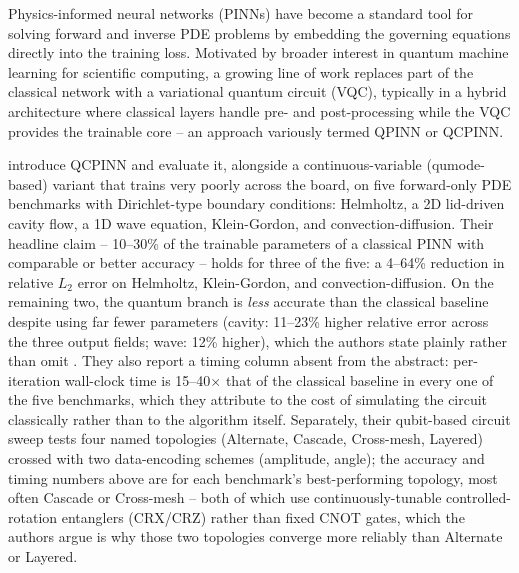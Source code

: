 
Physics-informed neural networks (PINNs) \citep{raissi2019pinn} have become
a standard tool for solving forward and inverse PDE problems by embedding
the governing equations directly into the training loss. Motivated by
broader interest in quantum machine learning for scientific computing, a
growing line of work replaces part of the classical network with a
variational quantum circuit (VQC), typically in a hybrid architecture where
classical layers handle pre- and post-processing while the VQC provides the
trainable core -- an approach variously termed QPINN or QCPINN.

\citet{farea2025qcpinn} introduce QCPINN and evaluate it, alongside a
continuous-variable (qumode-based) variant that trains very poorly across
the board, on five forward-only PDE benchmarks with Dirichlet-type boundary
conditions: Helmholtz, a 2D lid-driven cavity flow, a 1D wave equation,
Klein-Gordon, and convection-diffusion. Their headline claim -- 10--30\% of
the trainable parameters of a classical PINN with comparable or better
accuracy -- holds for three of the five: a 4--64\% reduction in relative
$L_2$ error on Helmholtz, Klein-Gordon, and convection-diffusion. On the
remaining two, the quantum branch is \emph{less} accurate than the
classical baseline despite using far fewer parameters (cavity: 11--23\%
higher relative error across the three output fields; wave: 12\% higher),
which the authors state plainly rather than omit \citep[Sec.~8,
``Conclusion'']{farea2025qcpinn}. They also report a timing column absent
from the abstract: per-iteration wall-clock time is 15--40$\times$ that of
the classical baseline in every one of the five benchmarks, which they
attribute to the cost of simulating the circuit classically rather than to
the algorithm itself. Separately, their qubit-based circuit sweep tests
four named topologies (Alternate, Cascade, Cross-mesh, Layered) crossed
with two data-encoding schemes (amplitude, angle); the accuracy and timing
numbers above are for each benchmark's best-performing topology, most
often Cascade or Cross-mesh -- both of which use continuously-tunable
controlled-rotation entanglers (CRX/CRZ) rather than fixed CNOT gates,
which the authors argue is why those two topologies converge more reliably
than Alternate or Layered.

